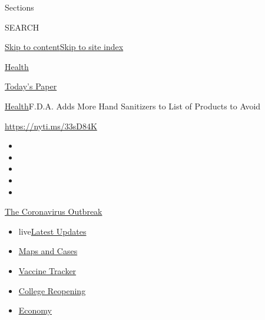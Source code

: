 Sections

SEARCH

\protect\hyperlink{site-content}{Skip to
content}\protect\hyperlink{site-index}{Skip to site index}

\href{https://www.nytimes.com/section/health}{Health}

\href{https://myaccount.nytimes.com/auth/login?response_type=cookie\&client_id=vi}{}

\href{https://www.nytimes.com/section/todayspaper}{Today's Paper}

\href{/section/health}{Health}\textbar{}F.D.A. Adds More Hand Sanitizers
to List of Products to Avoid

\url{https://nyti.ms/33sD84K}

\begin{itemize}
\item
\item
\item
\item
\item
\end{itemize}

\href{https://www.nytimes.com/news-event/coronavirus?action=click\&pgtype=Article\&state=default\&region=TOP_BANNER\&context=storylines_menu}{The
Coronavirus Outbreak}

\begin{itemize}
\tightlist
\item
  live\href{https://www.nytimes.com/2020/08/04/world/coronavirus-cases.html?action=click\&pgtype=Article\&state=default\&region=TOP_BANNER\&context=storylines_menu}{Latest
  Updates}
\item
  \href{https://www.nytimes.com/interactive/2020/us/coronavirus-us-cases.html?action=click\&pgtype=Article\&state=default\&region=TOP_BANNER\&context=storylines_menu}{Maps
  and Cases}
\item
  \href{https://www.nytimes.com/interactive/2020/science/coronavirus-vaccine-tracker.html?action=click\&pgtype=Article\&state=default\&region=TOP_BANNER\&context=storylines_menu}{Vaccine
  Tracker}
\item
  \href{https://www.nytimes.com/2020/08/02/us/covid-college-reopening.html?action=click\&pgtype=Article\&state=default\&region=TOP_BANNER\&context=storylines_menu}{College
  Reopening}
\item
  \href{https://www.nytimes.com/live/2020/08/04/business/stock-market-today-coronavirus?action=click\&pgtype=Article\&state=default\&region=TOP_BANNER\&context=storylines_menu}{Economy}
\end{itemize}

